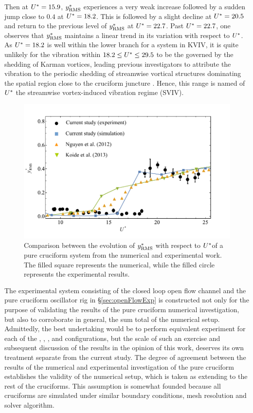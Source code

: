 \documentclass[oneside]{utmthesis}
\begin{document}
Then at $U^{*} = 15.9$, $y^{*}_{\text{RMS}}$ experiences a very weak increase followed by a sudden jump close to $0.4$ at $U^{*} = 18.2$. This is followed by a slight decline at $U^{*} = 20.5$ and return to the previous level of $y^{*}_{\text{RMS}}$ at $U^{*} = 22.7$. Past $U^{*} = 22.7$, one observes that $y^{*}_{\text{RMS}}$ maintains a linear trend in its variation with respect to $U^{*}$. As $U^{*} = 18.2$ is well within the lower branch for a system in KVIV, it is quite unlikely for the vibration within $18.2 \leq U^{*} \leq 29.5$ to be the governed by the shedding of Karman vortices, leading previous investigators to attribute the vibration to the periodic shedding of streamwise vortical structures dominating the spatial region close to the cruciform juncture \citep{Shirakashi1989,Hemsuwan2018b,Hemsuwan2018d}. Hence, this range is named of $U^{*}$ the streamwise vortex-induced vibration regime (SVIV).

\begin{figure}
  \centering
  \includegraphics[width=1\textwidth]{figs/expCompareAmp}
  \caption{Comparison between the evolution of $y^{*}_{\text{RMS}}$ with respect to $U^{*}$of a pure cruciform system from the numerical and experimental work. The filled square represents the numerical, while the filled circle represents the experimental results.}
  \label{fig:expCompareAmp}
\end{figure}

The experimental system consisting of the closed loop open flow channel and the pure cruciform oscillator rig in \S\ref{sec:openFlowExp} is constructed not only for the purpose of validating the results of the pure cruciform numerical investigation, but also to corroborate in general, the sum total of the numerical setup. Admittedly, the best undertaking would be to perform equivalent experiment for each of the \angfi{}, \angfo{}, \angth{}, \angtw{} and \angon{} configurations, but the scale of such an exercise and subsequent discussion of the results in the opinion of this work, deserves its own treatment separate from the current study. The degree of agreement between the results of the numerical and experimental investigation of the pure cruciform establishes the validity of the numerical setup, which is taken as extending to the rest of the cruciforms. This assumption is somewhat founded because all cruciforms are simulated under similar boundary conditions, mesh resolution and solver algorithm.
\end{document}
